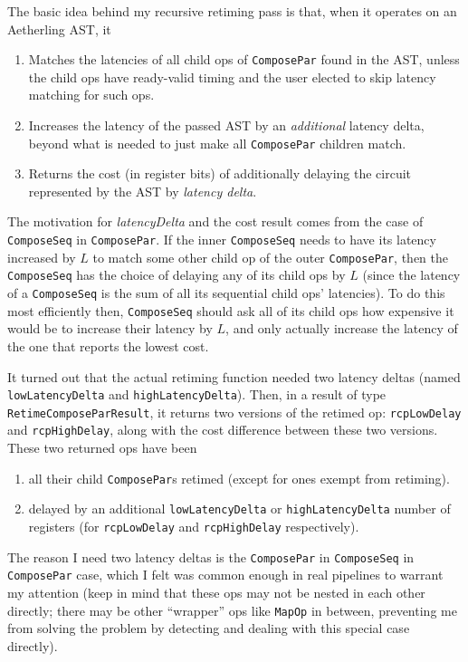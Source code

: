 \documentclass[12pt]{article}
\begin{document}
The basic idea behind my recursive retiming pass is that, when it
operates on an Aetherling AST, it
\begin{enumerate}
\item Matches the latencies of all child ops of \texttt{ComposePar}
  found in the AST, unless the child ops have ready-valid timing and
  the user elected to skip latency matching for such ops.

\item Increases the latency of the passed AST by an
  \textit{additional} latency delta, beyond what is needed to just
  make all \texttt{ComposePar} children match.

\item Returns the cost (in register bits) of additionally delaying the
  circuit represented by the AST by \textit{latency delta}.
\end{enumerate}
The motivation for \textit{latencyDelta} and the cost result comes
from the case of \texttt{ComposeSeq} in \texttt{ComposePar}. If the
inner \texttt{ComposeSeq} needs to have its latency increased by $L$
to match some other child op of the outer \texttt{ComposePar}, then
the \texttt{ComposeSeq} has the choice of delaying any of its child
ops by $L$ (since the latency of a \texttt{ComposeSeq} is the sum of
all its sequential child ops' latencies). To do this most efficiently
then, \texttt{ComposeSeq} should ask all of its child ops how
expensive it would be to increase their latency by $L$, and only
actually increase the latency of the one that reports the lowest cost.

It turned out that the actual retiming function needed two latency
deltas (named \texttt{lowLatencyDelta} and \texttt{highLatencyDelta}).
Then, in a result of type \texttt{RetimeComposeParResult}, it returns
two versions of the retimed op: \texttt{rcpLowDelay} and
\texttt{rcpHighDelay}, along with the cost difference between these
two versions. These two returned ops have been
\begin{enumerate}
\item all their child \texttt{ComposePar}s retimed (except for
ones exempt from retiming).
\item delayed by an additional \texttt{lowLatencyDelta} or
\texttt{highLatencyDelta} number of registers (for \texttt{rcpLowDelay}
and \texttt{rcpHighDelay} respectively). %
\end{enumerate}

The reason I need two latency deltas is the \texttt{ComposePar} in
\texttt{ComposeSeq} in \texttt{ComposePar} case, which I felt was
common enough in real pipelines to warrant my attention (keep in mind
that these ops may not be nested in each other directly; there may be
other ``wrapper'' ops like \texttt{MapOp} in between, preventing me
from solving the problem by detecting and dealing with this special
case directly).
\end{document}
